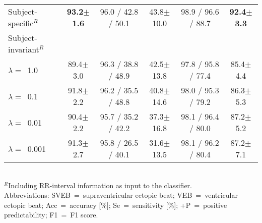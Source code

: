 \documentclass{article}
\newcommand{\std}[1]{{\scriptsize{$\pm$#1}}}
\begin{document}
\begin{table}[H]
\begin{tabular}{lccccc}
\hspace{10pt}Subject-specific$^{R}$
    & \textbf{93.2\std{1.6}}
    & 96.0 / 42.8 / 50.1 & 43.8\std{10.0}
    & 98.9 / 96.6 / 88.7 & \textbf{92.4\std{3.3}} \\

    \hspace{10pt}Subject-invariant$^{R}$\\
\hspace{15pt}$\lambda=$~1.0
    & 89.4\std{3.0}
    & 96.3 / 38.8 / 48.9 & 42.5\std{13.8}
    & 97.8 / 95.8 / 77.4 & 85.4\std{4.4} \\

\hspace{15pt}$\lambda=$~0.1
    & 91.8\std{2.2}
    & 96.2 / 35.5 / 48.8 & 40.8\std{14.6}
    & 98.0 / 95.3 / 79.2 & 86.3\std{5.3} \\

\hspace{15pt}$\lambda=$~0.01
    & 90.4\std{2.2}
    & 95.7 / 35.2 / 42.2 & 37.3\std{16.8}
    & 98.1 / 96.4 / 80.0 & 87.2\std{5.2} \\



\hspace{15pt}$\lambda=$~0.001
    & 91.3\std{2.7}
    & 95.8 / 26.5 / 40.1 & 31.6\std{13.5}
    & 98.1 / 96.2 / 80.4 & 87.2\std{7.1} \\

    \bottomrule
  \end{tabular}\\
  \footnotesize{$^R$Including RR-interval information as input to the
  classifier.\\
  Abbreviations: SVEB~=~supraventricular ectopic beat; VEB~=~ventricular ectopic
  beat; Acc~=~accuracy [\%]; Se~=~sensitivity [\%]; +P~=~positive
  predictability; F1~=~F1 score.}
\end{table} 
\end{document}
